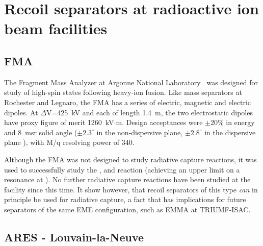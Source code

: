 \section{Recoil separators at radioactive ion beam facilities}

\subsection{FMA}
The Fragment Mass Analyzer at Argonne National Laboratory~\cite{Da92} was designed for study of high-spin states following heavy-ion fusion.  Like mass separators at Rochester and Legnaro, the FMA has a series of electric, magnetic and electric dipoles.   At $\Delta$V=425~kV and each of length 1.4~m, the two electrostatic dipoles have proxy figure of merit 1260~kV$\cdot$m.  Design acceptances were $\pm$20\% in energy and 8~msr solid angle ($\pm2.3^{\circ}$ in the non-dispersive plane, $\pm2.8^{\circ}$ in the dispersive plane \cite{dav12}), with M/q resolving power of 340.

Although the FMA was not designed to study radiative capture reactions, it was used to successfully study the , and   reaction \cite{reh97} (achieving an upper limit on a resonance at ). No further radiative capture reactions have been studied at the facility since this time. It show however, that recoil separators of this type {\em can} in principle be used for radiative capture, a fact that has implications for future separators of the same EME configuration, such as EMMA at TRIUMF-ISAC. 


\subsection{ARES - Louvain-la-Neuve}


